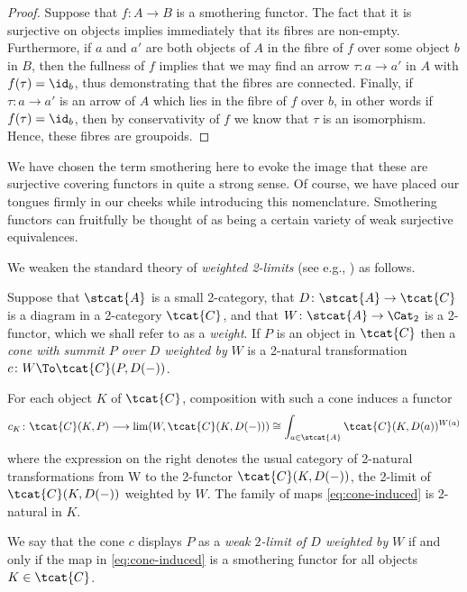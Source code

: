 \begin{proof}
  Suppose that $f\colon A\to B$ is a smothering functor. The fact that it is surjective on objects implies immediately that its fibres are non-empty. Furthermore, if $a$ and $a'$ are both objects of $A$ in the fibre of $f$ over some object $b$ in $B$,  then the fullness of $f$ implies that we may find an arrow $\tau\colon a\to a'$ in $A$ with $f(\tau)=\id_b$, thus demonstrating that the fibres are  connected. Finally, if $\tau\colon a\to a'$ is an arrow of $A$ which lies in the fibre of $f$ over $b$, in other words if $f(\tau) = \id_b$, then by conservativity of $f$ we know that $\tau$ is an isomorphism. Hence, these fibres are groupoids. 
\end{proof}

  We have chosen the term smothering here to evoke the image that these are surjective covering functors in quite a strong sense.  Of course, we have placed our tongues firmly in our cheeks while introducing this nomenclature. Smothering functors can fruitfully be thought of as being a certain variety of weak surjective equivalences.

We weaken the standard theory of {\em weighted 2-limits\/} (see e.g., \cite{Kelly:1989fk}) as follows. 

\begin{defn}\label{defn:weak2limit}
  Suppose that $\stcat{A}$ is a small 2-category, that $D \colon \stcat{A} \to \tcat{C}$ is a diagram in a 2-category $\tcat{C}$, and that $W\colon\stcat{A}\to\Cat_2$ is a 2-functor, which we shall refer to as a {\em weight}. If $P$ is an object in $\tcat{C}$ then a {\em cone with summit $P$ over $D$ weighted by\/} $W$ is a 2-natural transformation $c\colon W\To \tcat{C}(P,D(-))$. 

  For each object $K$ of $\tcat{C}$, composition with such a cone induces a functor
  \begin{equation}\label{eq:cone-induced}
    c_K\colon\tcat{C}(K,P)\longrightarrow \lim(W, \tcat{C}(K,D(-)))\cong\int_{a\in\stcat{A}} \tcat{C}(K,D(a))^{W(a)}
  \end{equation}
  where the expression on the right denotes the usual category of 2-natural transformations from W to the 2-functor $\tcat{C}(K,D(-))$, the 2-limit of $\tcat{C}(K,D(-))$  weighted by $W$. The family of maps \eqref{eq:cone-induced} is 2-natural in $K$.

  We say that the cone $c$ displays $P$ as a {\em weak $2$-limit of $D$ weighted by\/} $W$ if and only if the map in \eqref{eq:cone-induced} is a smothering functor for all objects $K\in\tcat{C}$.
\end{defn}


